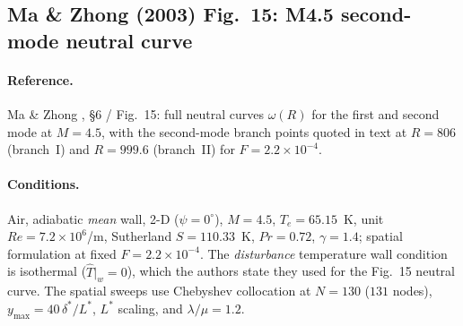 \documentclass[11pt]{article}
\begin{document}
\subsection{Ma \& Zhong (2003) Fig.~15: M4.5 second-mode neutral curve}
\label{sec:mazhong}

\paragraph{Reference.} Ma \& Zhong \cite{mazhong2003}, \S6 / Fig.~15: full neutral curves
$\omega(R)$ for the first and second mode at $M=4.5$, with the second-mode branch points quoted in
text at $R=806$ (branch~I) and $R=999.6$ (branch~II) for $F=2.2\times10^{-4}$.

\paragraph{Conditions.} Air, adiabatic \emph{mean} wall, 2-D ($\psi=0^\circ$), $M=4.5$,
$T_e=65.15$~K, unit $Re=7.2\times10^6$/m, Sutherland $S=110.33$~K, $Pr=0.72$, $\gamma=1.4$;
spatial formulation at fixed $F=2.2\times10^{-4}$. The \emph{disturbance} temperature wall
condition is isothermal ($\hat{T}|_{w}=0$), which the authors state they used for the Fig.~15
neutral curve. The spatial sweeps use Chebyshev collocation at $N=130$ ($131$ nodes),
$y_{\max}=40\,\delta^\ast/L^\ast$, $L^\ast$ scaling, and $\lambda/\mu=1.2$.
\end{document}

